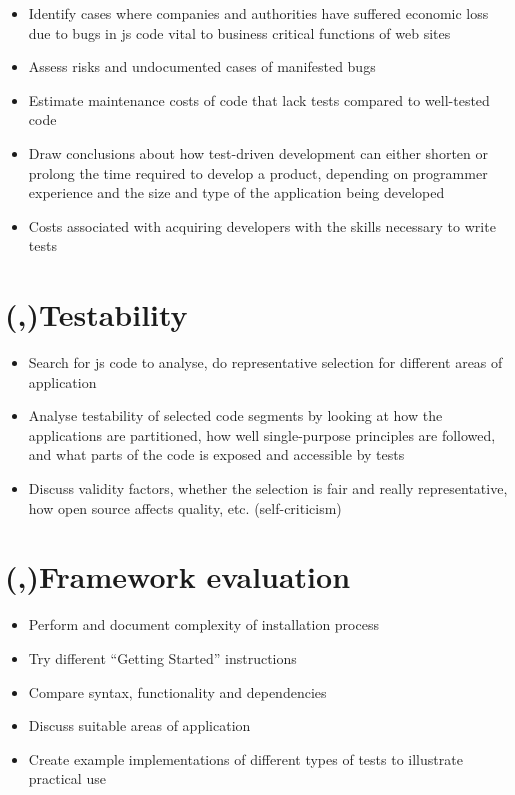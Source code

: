 \documentclass[11pt]{article}
\begin{document}
\begin{itemize}
  \item Identify cases where companies and authorities have suffered economic loss due to bugs in \gls{js} code vital to business critical functions of web sites
  \item Assess risks and undocumented cases of manifested bugs
  \item Estimate maintenance costs of code that lack tests compared to well-tested code
  \item Draw conclusions about how test-driven development can either shorten or prolong the time required to develop a product, depending on programmer experience and the size and type of the application being developed
  \item Costs associated with acquiring developers with the skills necessary to write tests
\end{itemize}

\section{(,)Testability}

\begin{itemize}
  \item Search for \gls{js} code to analyse, do representative selection for different areas of application
  \item Analyse testability of selected code segments by looking at how the applications are partitioned, how well single-purpose principles are followed, and what parts of the code is exposed and accessible by tests
  \item Discuss validity factors, whether the selection is fair and really representative, how open source affects quality, etc. (self-criticism)
\end{itemize}

\section{(,)Framework evaluation}

\begin{itemize}
  \item Perform and document complexity of installation process
  \item Try different ``Getting Started'' instructions
  \item Compare syntax, functionality and dependencies
  \item Discuss suitable areas of application
  \item Create example implementations of different types of tests to illustrate practical use
\end{itemize}
\end{document}
